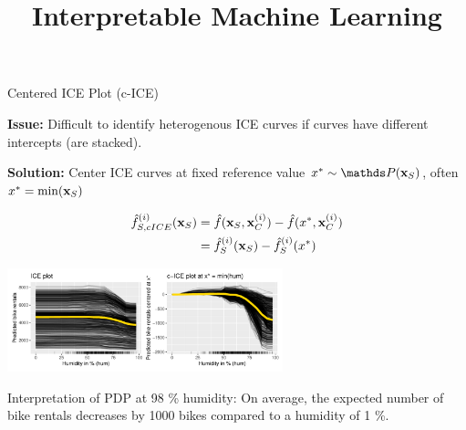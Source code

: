 \documentclass[11pt,compress,t,notes=noshow, aspectratio=169, xcolor=table]{beamer}
\title{Interpretable Machine Learning}
\date{}
\begin{document}
\newcommand{\titlefigure}{figure/pdp_bike}
\newcommand{\learninggoals}{
\item Understand c-ICE curves to identify the heterogeneity in the model
\item Understand the extrapolation issue}



\begin{frame}{Centered ICE Plot (c-ICE)}

\textbf{Issue:} Difficult to identify heterogenous ICE curves if curves have different intercepts (are stacked).

\textbf{Solution:} Center ICE curves at fixed reference value $x^* \sim \P(\xv_S)$, often $x^* = \min(\xv_S)$

$$\begin{aligned}
\fh_{S, cICE}^{(i)}(\xv_S)
&= \fh(\xv_S, \xi_C) - \fh(x^*, \xi_C) \\
&= \fh_{S}^{(i)}(\xv_S) - \fh_{S}^{(i)}(x^*)
\end{aligned}$$

\begin{center}
\includegraphics[width=0.6\textwidth]{figure/cICE}
\end{center}

Interpretation of PDP at 98 \% humidity: On average, the expected number of bike rentals decreases by 1000 bikes compared to a humidity of 1 \%.
\end{frame}
\end{document}
